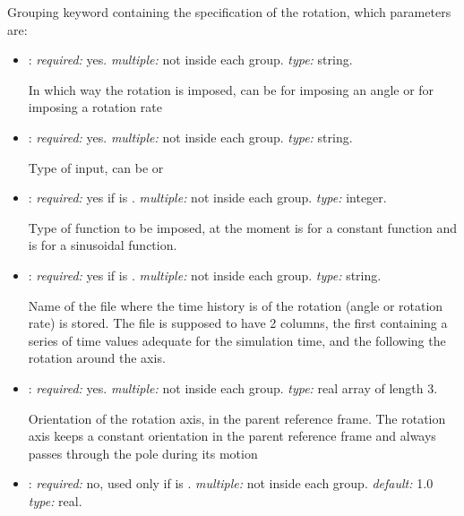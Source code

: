 \begin{itemize}
Grouping keyword containing the specification of the rotation, which parameters are:

	\begin{itemize}
	\item {}: \textit{required:} yes. \textit{multiple:} not inside each  group. \textit{type:} string.
    
    In which way the rotation is imposed, can be  for imposing an angle  or  for imposing a rotation rate
    
    \item {}: \textit{required:} yes. \textit{multiple:} not inside each  group. \textit{type:} string.
    
    Type of input, can be  or 
    
    \item {}: \textit{required:} yes if  is . \textit{multiple:} not inside each  group. \textit{type:} integer.
    
    Type of function to be imposed, at the moment  is for a constant function and  is for a sinusoidal function.
    
        \item {}: \textit{required:} yes if  is . \textit{multiple:} not inside each  group. \textit{type:} string.
        
        Name of the file where the time history is of the rotation (angle or rotation rate) is stored. The file is supposed to have 2 columns, the first containing a series of time values adequate for the simulation time, and the following the rotation around the axis. 
        
    \item {}: \textit{required:} yes. \textit{multiple:} not inside each  group. \textit{type:} real array of length 3.
    
    Orientation of the rotation axis, in the parent reference frame. The rotation axis keeps a constant orientation in the parent reference frame and always passes through the pole during its motion
    
    \item {}: \textit{required:} no, used only if  is . \textit{multiple:} not inside each  group. \textit{default:} 1.0 \textit{type:} real.
    

\end{itemize}
\end{itemize}
